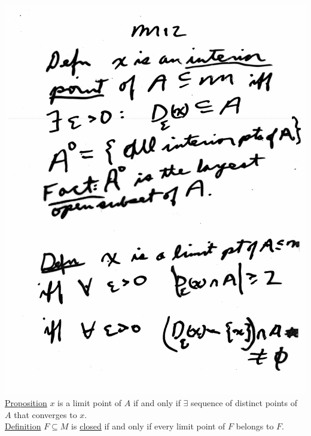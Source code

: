 \documentclass[10pt,a4paper]{article}
\begin{document}
{{\begin{flushleft}
\includegraphics[scale=.5]{Pages/MS_12}
\newpage
\underline{Proposition} $x$ is a limit point of $A$ if and only if $\exists$ sequence of distinct points of $A$ that converges to $x$. \\ \underline{Definition} $F \subseteq M$ is \underline{closed} if and only if every limit point of $F$ belongs to $F$.

\end{flushleft}}}
\end{document}
